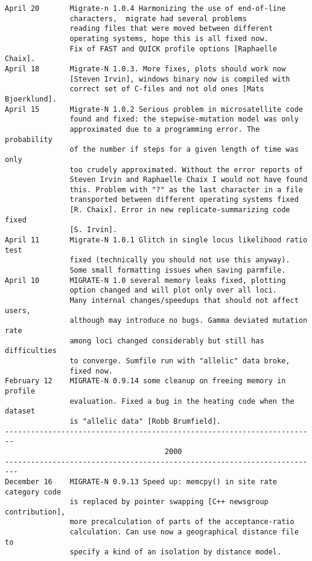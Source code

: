 \begin{small}
\begin{verbatim}
April 20       Migrate-n 1.0.4 Harmonizing the use of end-of-line
               characters,  migrate had several problems 
               reading files that were moved between different
               operating systems, hope this is all fixed now. 
               Fix of FAST and QUICK profile options [Raphaelle Chaix].  
April 18       Migrate-N 1.0.3. More fixes, plots should work now 
               [Steven Irvin], windows binary now is compiled with 
               correct set of C-files and not old ones [Mats Bjoerklund].
April 15       Migrate-N 1.0.2 Serious problem in microsatellite code
               found and fixed: the stepwise-mutation model was only 
               approximated due to a programming error. The probability 
               of the number if steps for a given length of time was only
               too crudely approximated. Without the error reports of
               Steven Irvin and Raphaelle Chaix I would not have found 
               this. Problem with "?" as the last character in a file
               transported between different operating systems fixed 
               [R. Chaix]. Error in new replicate-summarizing code fixed
               [S. Irvin].
April 11       Migrate-N 1.0.1 Glitch in single locus likelihood ratio test
               fixed (technically you should not use this anyway).
               Some small formatting issues when saving parmfile.
April 10       MIGRATE-N 1.0 several memory leaks fixed, plotting
               option changed and will plot only over all loci.
               Many internal changes/speedups that should not affect users,
               although may introduce no bugs. Gamma deviated mutation rate
               among loci changed considerably but still has difficulties
               to converge. Sumfile run with "allelic" data broke,    
               fixed now.
February 12    MIGRATE-N 0.9.14 some cleanup on freeing memory in profile
               evaluation. Fixed a bug in the heating code when the dataset
               is "allelic data" [Robb Brumfield].
------------------------------------------------------------------------
                                     2000
-------------------------------------------------------------------------
December 16    MIGRATE-N 0.9.13 Speed up: memcpy() in site rate category code
               is replaced by pointer swapping [C++ newsgroup contribution],
               more precalculation of parts of the acceptance-ratio 
               calculation. Can use now a geographical distance file to 
               specify a kind of an isolation by distance model. 

\end{verbatim}
\end{small}

